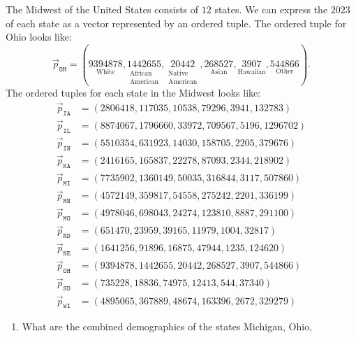 \documentclass{ximera}
\begin{document}
\begin{example} %
    The Midwest of the United States consists of $12$ states. We can
    express the $2023$
    of each state as a vector represented by an ordered tuple. The
    ordered tuple for Ohio looks like:
    \[
    \vec{p}_{\texttt{OH}} = (\underset{\text{White}}{9394878},\underset{\begin{smallmatrix}\text{African}\\ \text{American}\end{smallmatrix}}{1442655},\underset{\begin{smallmatrix}\text{Native}\\\text{American}\end{smallmatrix}}{20442},\underset{\text{Asian}}{268527},\underset{\text{Hawaiian}}{3907},\underset{\text{Other}}{544866}).
    \]
    The ordered tuples for each state in the Midwest looks like:
  \begin{align*}
    \vec{p}_{\texttt{IA}} &= (2806418,117035,10538,79296,3941,132783)\\
    \vec{p}_{\texttt{IL}} &= (8874067,1796660,33972,709567,5196,1296702)\\
    \vec{p}_{\texttt{IN}} &= (5510354,631923,14030,158705,2205,379676)\\
    \vec{p}_{\texttt{KA}} &= (2416165,165837,22278,87093,2344,218902)\\
    \vec{p}_{\texttt{MI}} &= (7735902,1360149,50035,316844,3117,507860)\\
    \vec{p}_{\texttt{MN}} &= (4572149,359817,54558,275242,2201,336199)\\
    \vec{p}_{\texttt{MO}} &= (4978046,698043,24274,123810,8887,291100)\\
    \vec{p}_{\texttt{ND}} &= (651470,23959,39165,11979,1004,32817)\\
    \vec{p}_{\texttt{NE}} &= (1641256,91896,16875,47944,1235,124620)\\
    \vec{p}_{\texttt{OH}} &= (9394878,1442655,20442,268527,3907,544866)\\
    \vec{p}_{\texttt{SD}} &= (735228,18836,74975,12413,544,37340)\\
    \vec{p}_{\texttt{WI}} &= (4895065,367889,48674,163396,2672,329279)
  \end{align*}
  \begin{enumerate}
  \item What are the combined demographics of the states Michigan, Ohio,

\end{enumerate}
\end{example}
\end{document}
